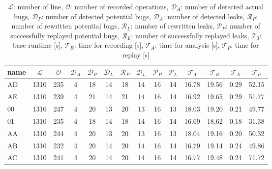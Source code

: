 \begin{table}[h]
\begin{tabular}{|l|c|c|c|c|c|c|c|c|c|c|c|c|c|}
\hline
name  & $\mathcal{L}$ & $\mathcal{O}$ & $\mathcal{D}_A$ & $\mathcal{D}_P$ & $\mathcal{D}_L$ & $\mathcal{R}_P$ & $\mathcal{D}_L$ & $\mathcal{P}_P$ & $\mathcal{P}_L$ & $\mathcal{T}_0$ & $\mathcal{T}_R$ & $\mathcal{T}_A$ & $\mathcal{T}_P$ \\ \hline
AD & 1310 & 235 & 4 & 18 & 14 & 18 & 14 & 16 & 14 & 16.78 & 19.56 & 0.29 & 52.15 \\ \hline
AE & 1310 & 239 & 4 & 21 & 14 & 21 & 14 & 16 & 14 & 16.92 & 19.65 & 0.29 & 51.77 \\ \hline
00 & 1310 & 247 & 4 & 20 & 13 & 20 & 13 & 16 & 13 & 18.03 & 19.20 & 0.21 & 49.77 \\ \hline
01 & 1310 & 235 & 4 & 18 & 14 & 18 & 14 & 16 & 14 & 16.69 & 18.62 & 0.18 & 31.38 \\ \hline
AA & 1310 & 244 & 4 & 20 & 13 & 20 & 13 & 16 & 13 & 18.04 & 19.16 & 0.20 & 50.32 \\ \hline
AB & 1310 & 232 & 4 & 20 & 14 & 20 & 14 & 16 & 14 & 16.79 & 19.14 & 0.24 & 49.86 \\ \hline
AC & 1310 & 241 & 4 & 20 & 14 & 20 & 14 & 16 & 14 & 16.77 & 19.48 & 0.24 & 71.72 \\ \hline
\end{tabular}
\caption{$\mathcal{L}$: number of line, $\mathcal{O}$: number of recorded operations, $\mathcal{D}_A$: number of detected actual bugs, $\mathcal{D}_P$: number of detected potential bugs, $\mathcal{D}_A$: number of detected leaks, $\mathcal{R}_P$: number of rewritten potential bugs, $\mathcal{R}_L$: number of rewritten leaks, $\mathcal{P}_P$: number of successfully replayed potential bugs, $\mathcal{R}_L$: number of successfully replayed leaks, $\mathcal{T}_0$: base runtime [s], $\mathcal{T}_R$: time for recording [s], $\mathcal{T}_A$: time for analysis [s], $\mathcal{T}_P$: time for replay [s]}
\label{}
\end{table}